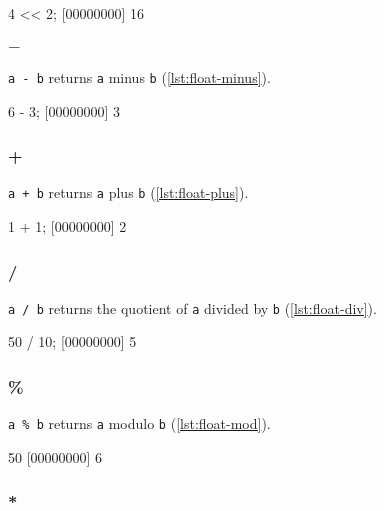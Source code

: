 \begin{urbiscript}[caption=Float.'$<<$', label=lst:float-lshift]
4 << 2;
[00000000] 16
\end{urbiscript}

\subsubsection{$-$}

\lstinline|a - b| returns \lstinline|a| minus \lstinline|b|
(\autoref{lst:float-minus}).

\begin{urbiscript}[caption=Float.'-', label=lst:float-minus]
6 - 3;
[00000000] 3
\end{urbiscript}

\subsubsection{+}

\lstinline|a + b| returns \lstinline|a| plus \lstinline|b|
(\autoref{lst:float-plus}).

\begin{urbiscript}[caption=Float.'+', label=lst:float-plus]
1 + 1;
[00000000] 2
\end{urbiscript}

\subsubsection{/}

\lstinline|a / b| returns the quotient of \lstinline|a| divided by
\lstinline|b| (\autoref{lst:float-div}).

\begin{urbiscript}[caption=Float.'/', label=lst:float-div]
50 / 10;
[00000000] 5
\end{urbiscript}

\subsubsection{\%}

\lstinline|a % b|
returns \lstinline|a| modulo \lstinline|b| (\autoref{lst:float-mod}).

\begin{urbiscript}[caption=Float.'\%', label=lst:float-mod]
50 %
[00000000] 6
\end{urbiscript}

\subsubsection{*}

